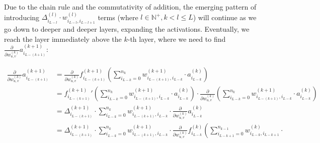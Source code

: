\documentclass[titlepage]{article}
\begin{document}
          Due to the chain rule and the commutativity of addition, the emerging
          pattern of introducing
          $\Delta_{i_{L-l}}^{(l)} \cdot w_{i_{L-l},i_{L-l+1}}^{(l)}$ terms
          (where $l \in \mathbb{N}^+, k < l \leq L$)
          will continue as we go down to deeper and deeper layers, expanding the
          activations. Eventually, we reach the layer immediately above the
          $k$-th layer, where we need to find
          $\frac{\partial}{\partial w_{u,v}^{(k)}} a_{i_{L-(k+1)}}^{(k+1)}$:

          \begin{equation}
            \begin{split}
              \frac{\partial}{\partial w_{u,v}^{(k)}}
                a_{i_{L-(k+1)}}^{(k+1)}
                  & = \frac{\partial}{\partial w_{u,v}^{(k)}}
                        f_{i_{L-(k+1)}}^{(k+1)} \left(
                          \sum_{i_{L-k}=0}^{n_k}
                            w_{i_{L-(k+1)},i_{L-k}}^{(k+1)}
                            \cdot
                            a_{i_{L-k}}^{(k)}
                        \right) \\
                  & = {f_{i_{L-(k+1)}}^{(k+1)}}' \left(
                        \sum_{i_{L-k}=0}^{n_k}
                          w_{i_{L-(k+1)},i_{L-k}}^{(k+1)}
                          \cdot
                          a_{i_{L-k}}^{(k)}
                      \right)
                      \cdot
                      \frac{\partial}{\partial w_{u,v}^{(k)}}
                        \left(
                          \sum_{i_{L-k}=0}^{n_k}
                            w_{i_{L-(k+1)},i_{L-k}}^{(k+1)}
                            \cdot
                            a_{i_{L-k}}^{(k)}
                        \right) \\
                & = \Delta_{i_{L-(k+1)}}^{(k+1)}
                    \cdot
                    \sum_{i_{L-k}=0}^{n_k}
                      w_{i_{L-(k+1)},i_{L-k}}^{(k+1)}
                      \cdot
                      \frac{\partial}{\partial w_{u,v}^{(k)}}
                        a_{i_{L-k}}^{(k)} \\
                & = \Delta_{i_{L-(k+1)}}^{(k+1)}
                    \cdot
                    \sum_{i_{L-k}=0}^{n_k}
                      w_{i_{L-(k+1)},i_{L-k}}^{(k+1)}
                      \cdot
                      \frac{\partial}{\partial w_{u,v}^{(k)}}
                        f_{i_{L-k}}^{(k)} \left(
                          \sum_{i_{L-k+1}=0}^{n_{k-1}}
                            w_{i_{L-k},i_{L-k+1}}^{(k)}
                            \cdot

\end{split}
\end{equation}
\end{document}
